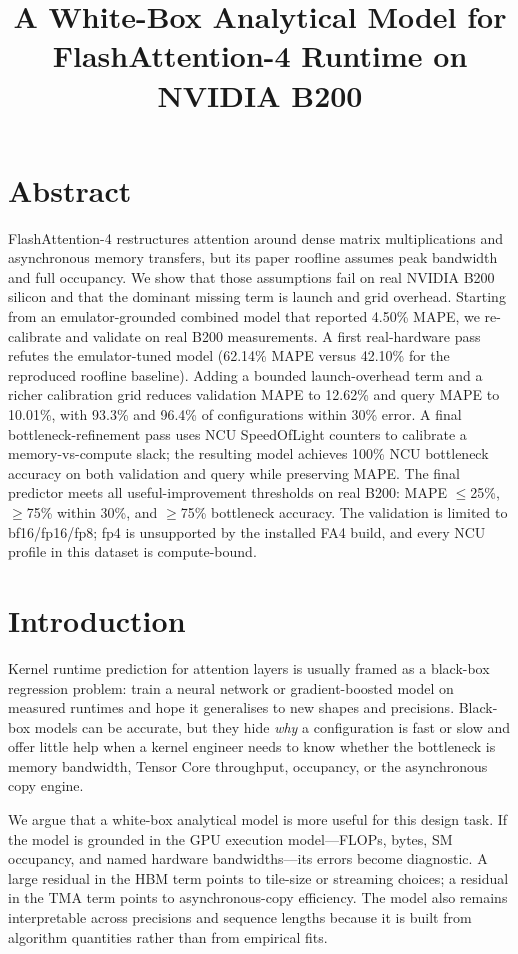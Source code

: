 \documentclass[
  11pt,
]{article}
\title{A White-Box Analytical Model for FlashAttention-4 Runtime on
NVIDIA B200}
\author{}
\date{}
\begin{document}
\maketitle

\section*{Abstract}\label{abstract}

FlashAttention-4 restructures attention around dense matrix
multiplications and asynchronous memory transfers, but its paper
roofline assumes peak bandwidth and full occupancy. We show that those
assumptions fail on real NVIDIA B200 silicon and that the dominant
missing term is launch and grid overhead. Starting from an
emulator-grounded combined model that reported 4.50\% MAPE, we
re-calibrate and validate on real B200 measurements. A first
real-hardware pass refutes the emulator-tuned model (62.14\% MAPE versus
42.10\% for the reproduced roofline baseline). Adding a bounded
launch-overhead term and a richer calibration grid reduces validation
MAPE to 12.62\% and query MAPE to 10.01\%, with 93.3\% and 96.4\% of
configurations within 30\% error. A final bottleneck-refinement pass
uses NCU SpeedOfLight counters to calibrate a memory-vs-compute slack;
the resulting model achieves 100\% NCU bottleneck accuracy on both
validation and query while preserving MAPE. The final predictor meets
all useful-improvement thresholds on real B200: MAPE $\le$25\%,
$\ge$75\% within 30\%, and $\ge$75\% bottleneck accuracy. The
validation is limited to bf16/fp16/fp8; fp4 is unsupported by the
installed FA4 build, and every NCU profile in this dataset is
compute-bound.

\section{Introduction}\label{introduction}

Kernel runtime prediction for attention layers is usually framed as a
black-box regression problem: train a neural network or gradient-boosted
model on measured runtimes and hope it generalises to new shapes and
precisions. Black-box models can be accurate, but they hide \emph{why} a
configuration is fast or slow and offer little help when a kernel
engineer needs to know whether the bottleneck is memory bandwidth,
Tensor Core throughput, occupancy, or the asynchronous copy engine.

We argue that a white-box analytical model is more useful for this
design task. If the model is grounded in the GPU execution
model---FLOPs, bytes, SM occupancy, and named hardware bandwidths---its
errors become diagnostic. A large residual in the HBM term points to
tile-size or streaming choices; a residual in the TMA term points to
asynchronous-copy efficiency. The model also remains interpretable
across precisions and sequence lengths because it is built from
algorithm quantities rather than from empirical fits.
\end{document}
